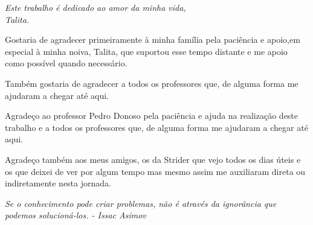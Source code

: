 \documentclass[
	12pt,				%
	openany,
	onseside,
	a4paper,			%
	english,			%
	french,				%
	spanish,			%
	brazil,				%
	]{abntex2}
\begin{document}
\frenchspacing 

\pretextual

\AtBeginShipoutNext{\AtBeginShipoutNext{\AtBeginShipoutDiscard}}
\imprimircapa

\AtBeginShipoutNext{\AtBeginShipoutNext{\AtBeginShipoutDiscard}}
\imprimirfolhaderosto

\AtBeginShipoutNext{\AtBeginShipoutNext{\AtBeginShipoutDiscard}}
	\begin{dedicatoria}
	   \vspace*{\fill}
	   \centering
	   \noindent
	   \textit{ Este trabalho é dedicado ao amor da minha vida,\\
	   		Talita.} \vspace*{\fill}
	\end{dedicatoria}


\AtBeginShipoutNext{\AtBeginShipoutNext{\AtBeginShipoutDiscard}}
	\begin{agradecimentos}

	Gostaria de agradecer primeiramente à minha família pela paciência e apoio,em especial à minha noiva, Talita, que suportou esse tempo distante e me apoio como possível quando necessário.  

	Também gostaria de agradecer a todos os professores que, de alguma forma me ajudaram a chegar até aqui. 

	Agradeço ao professor Pedro Donoso pela paciência e ajuda na realização deste trabalho e a todos os professores que, de alguma forma me ajudaram a chegar até aqui.
	
	Agradeço também aos meus amigos, os da Strider que vejo todos os dias úteis e os que deixei de ver por algum tempo mas mesmo assim me auxiliaram direta ou indiretamente nesta jornada.

	\end{agradecimentos}


\AtBeginShipoutNext{\AtBeginShipoutNext{\AtBeginShipoutDiscard}}
	\begin{epigrafe}
			\vspace*{\fill}
		\begin{flushright}
			\textit{Se o conhecimento pode criar problemas, não é através da ignorância que podemos solucioná-los. - Issac Asimov}
		\end{flushright}
	\end{epigrafe}
\end{document}
